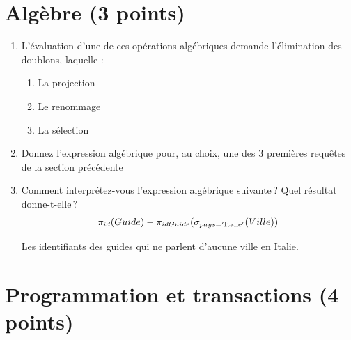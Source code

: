 \section{Algèbre (3 points)}

\begin{enumerate}
   \item L’évaluation d’une  de ces opérations algébriques demande l’élimination des doublons, laquelle :
 \begin{enumerate}
        \item  La projection
       \item  Le renommage
       \item La sélection
\end{enumerate}


\item Donnez l'expression algébrique pour, au choix,  une des 3 premières requêtes de la section précédente

\item Comment interprétez-vous l'expression algébrique suivante\,? Quel résultat donne-t-elle\,?
$$\pi_{id}(Guide) - \pi_{idGuide} (\sigma_{pays = '\rm{Italie}'}(Ville))$$
\begin{solution}
Les identifiants des guides qui ne parlent d'aucune ville en Italie.
\end{solution}
\end{enumerate}

\section{Programmation et transactions (4 points)}

